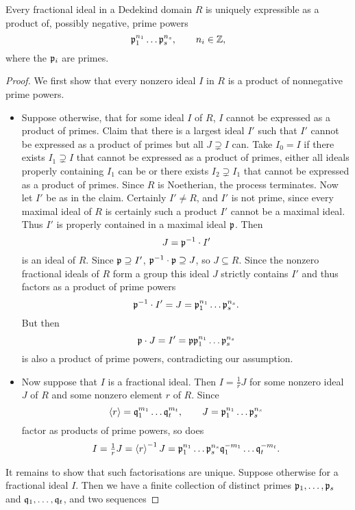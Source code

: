 \begin{proposition}
Every fractional ideal in a Dedekind domain $ R $ is uniquely expressible as a product of, possibly negative, prime powers
$$ \mathfrak{p}_1^{n_1} \dots \mathfrak{p}_s^{n_s}, \qquad n_i \in \mathbb{Z}, $$
where the $ \mathfrak{p}_i $ are primes.
\end{proposition}

\begin{proof}
We first show that every nonzero ideal $ I $ in $ R $ is a product of nonnegative prime powers.
\begin{itemize}
\item Suppose otherwise, that for some ideal $ I $ of $ R $, $ I $ cannot be expressed as a product of primes. Claim that there is a largest ideal $ I' $ such that $ I' $ cannot be expressed as a product of primes but all $ J \supsetneq I $ can. Take $ I_0 = I $ if there exists $ I_1 \supsetneq I $ that cannot be expressed as a product of primes, either all ideals properly containing $ I_1 $ can be or there exists $ I_2 \supsetneq I_1 $ that cannot be expressed as a product of primes. Since $ R $ is Noetherian, the process terminates. Now let $ I' $ be as in the claim. Certainly $ I' \ne R $, and $ I' $ is not prime, since every maximal ideal of $ R $ is certainly such a product $ I' $ cannot be a maximal ideal. Thus $ I' $ is properly contained in a maximal ideal $ \mathfrak{p} $. Then
$$ J = \mathfrak{p}^{-1} \cdot I' $$
is an ideal of $ R $. Since $ \mathfrak{p} \supseteq I' $, $ \mathfrak{p}^{-1} \cdot \mathfrak{p} \supseteq J $, so $ J \subseteq R $. Since the nonzero fractional ideals of $ R $ form a group this ideal $ J $ strictly contains $ I' $ and thus factors as a product of prime powers
$$ \mathfrak{p}^{-1} \cdot I' = J = \mathfrak{p}_1^{n_1} \dots \mathfrak{p}_s^{n_s}. $$
But then
$$ \mathfrak{p} \cdot J = I' = \mathfrak{p}\mathfrak{p}_1^{n_1} \dots \mathfrak{p}_s^{n_s} $$
is also a product of prime powers, contradicting our assumption.
\item Now suppose that $ I $ is a fractional ideal. Then $ I = \tfrac{1}{r}J $ for some nonzero ideal $ J $ of $ R $ and some nonzero element $ r $ of $ R $. Since
$$ \left\langle r \right\rangle = \mathfrak{q}_1^{m_1} \dots \mathfrak{q}_t^{m_t}, \qquad J = \mathfrak{p}_1^{n_1} \dots \mathfrak{p}_s^{n_s} $$
factor as products of prime powers, so does
$$ I = \tfrac{1}{r}J = \left\langle r \right\rangle^{-1}J = \mathfrak{p}_1^{n_1} \dots \mathfrak{p}_s^{n_s}\mathfrak{q}_1^{-m_1} \dots \mathfrak{q}_t^{-m_t}. $$
\end{itemize}
It remains to show that such factorisations are unique. Suppose otherwise for a fractional ideal $ I $. Then we have a finite collection of distinct primes $ \mathfrak{p}_1, \dots, \mathfrak{p}_s $ and $ \mathfrak{q}_1, \dots, \mathfrak{q}_t $, and two sequences

\end{proof}
